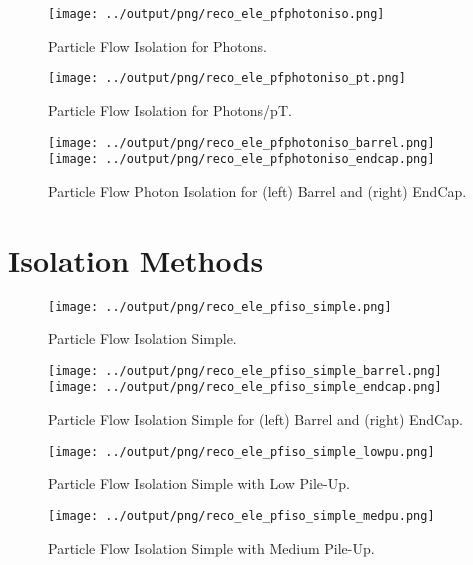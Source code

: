 \documentclass[11pt]{book}
\begin{document}
\begin{figure}[ht]
\centering
\texttt{[image: ../output/png/reco\_ele\_pfphotoniso.png]}
\caption{Particle Flow Isolation for Photons.}
\label{fig:reco_ele_pfphotoniso}
\end{figure}

\begin{figure}[ht]
\centering
\texttt{[image: ../output/png/reco\_ele\_pfphotoniso\_pt.png]}
\caption{Particle Flow Isolation for Photons/pT.}
\label{fig:reco_ele_pfphotoniso_pt}
\end{figure}

\begin{figure}[ht]
\centering
\texttt{[image: ../output/png/reco\_ele\_pfphotoniso\_barrel.png]}
\texttt{[image: ../output/png/reco\_ele\_pfphotoniso\_endcap.png]}
\caption{Particle Flow Photon Isolation for (left) Barrel and (right) EndCap.}
\label{fig:reco_ele_pfphotoniso_regions}
\end{figure}
\clearpage

\section{Isolation Methods}
\begin{figure}[ht]
\centering
\texttt{[image: ../output/png/reco\_ele\_pfiso\_simple.png]}
\caption{Particle Flow Isolation Simple.}
\label{fig:reco_ele_pfiso_simple}
\end{figure}

\begin{figure}[ht]
\centering
\texttt{[image: ../output/png/reco\_ele\_pfiso\_simple\_barrel.png]}
\texttt{[image: ../output/png/reco\_ele\_pfiso\_simple\_endcap.png]}
\caption{Particle Flow Isolation Simple for (left) Barrel and (right) EndCap.}
\label{fig:reco_ele_pfiso_simple_regions}
\end{figure}

\begin{figure}[ht]
\centering
\texttt{[image: ../output/png/reco\_ele\_pfiso\_simple\_lowpu.png]}
\caption{Particle Flow Isolation Simple with Low Pile-Up.}
\label{fig:reco_ele_pfiso_simple_lowpu}
\end{figure}

\begin{figure}[ht]
\centering
\texttt{[image: ../output/png/reco\_ele\_pfiso\_simple\_medpu.png]}
\caption{Particle Flow Isolation Simple with Medium Pile-Up.}
\label{fig:reco_ele_pfiso_simple_medpu}
\end{figure}
\end{document}
